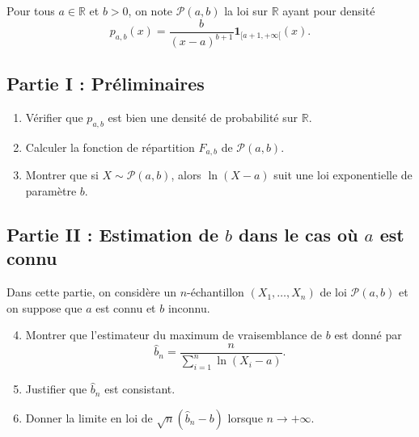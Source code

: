 \begin{mdframed}
\begin{exercice}
Pour tous $a \in \mathbb{R}$ et $b > 0$, on note $\mathcal{P}(a, b)$ la loi sur $\mathbb{R}$ ayant pour densité
\begin{equation*}
p_{a,b}(x) = \frac{b}{(x - a)^{b+1}} \mathbf{1}_{[a+1, +\infty[}(x).
\end{equation*}

\subsection*{Partie I : Préliminaires}
\begin{enumerate}
    \item Vérifier que $p_{a,b}$ est bien une densité de probabilité sur $\mathbb{R}$.
    \item Calculer la fonction de répartition $F_{a,b}$ de $\mathcal{P}(a, b)$.
    \item Montrer que si $X \sim \mathcal{P}(a, b)$, alors $\ln(X - a)$ suit une loi exponentielle de paramètre $b$.
\end{enumerate}

\subsection*{Partie II : Estimation de $b$ dans le cas où $a$ est connu}
Dans cette partie, on considère un $n$-échantillon $(X_1, \dots, X_n)$ de loi $\mathcal{P}(a, b)$ et on suppose que $a$ est connu et $b$ inconnu.
\begin{enumerate}
    \setcounter{enumi}{3}
    \item Montrer que l'estimateur du maximum de vraisemblance de $b$ est donné par
    \begin{equation*}
    \hat{b}_n = \frac{n}{\sum_{i=1}^n \ln(X_i - a)}.
    \end{equation*}
    \item Justifier que $\hat{b}_n$ est consistant.
    \item Donner la limite en loi de $\sqrt{n}(\hat{b}_n - b)$ lorsque $n \to + \infty$.
\end{enumerate}


\end{exercice}
\end{mdframed}
